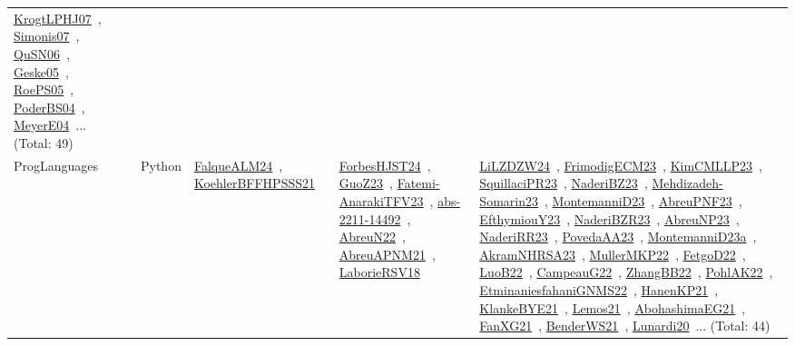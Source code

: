 {\begin{longtable}{lp{3cm}>{\raggedright\arraybackslash}p{6cm}>{\raggedright\arraybackslash}p{6cm}>{\raggedright\arraybackslash}p{8cm}}
\href{../works/KrogtLPHJ07.pdf}{KrogtLPHJ07}~\cite{KrogtLPHJ07}, \href{../works/Simonis07.pdf}{Simonis07}~\cite{Simonis07}, \href{../works/QuSN06.pdf}{QuSN06}~\cite{QuSN06}, \href{../works/Geske05.pdf}{Geske05}~\cite{Geske05}, \href{../works/RoePS05.pdf}{RoePS05}~\cite{RoePS05}, \href{../works/PoderBS04.pdf}{PoderBS04}~\cite{PoderBS04}, \href{../works/MeyerE04.pdf}{MeyerE04}~\cite{MeyerE04}... (Total: 49)\\
\index{Python}\index{ProgLanguages!Python}ProgLanguages & Python & \href{../works/FalqueALM24.pdf}{FalqueALM24}~\cite{FalqueALM24}, \href{../works/KoehlerBFFHPSSS21.pdf}{KoehlerBFFHPSSS21}~\cite{KoehlerBFFHPSSS21} & \href{../works/ForbesHJST24.pdf}{ForbesHJST24}~\cite{ForbesHJST24}, \href{../works/GuoZ23.pdf}{GuoZ23}~\cite{GuoZ23}, \href{../works/Fatemi-AnarakiTFV23.pdf}{Fatemi-AnarakiTFV23}~\cite{Fatemi-AnarakiTFV23}, \href{../works/abs-2211-14492.pdf}{abs-2211-14492}~\cite{abs-2211-14492}, \href{../works/AbreuN22.pdf}{AbreuN22}~\cite{AbreuN22}, \href{../works/AbreuAPNM21.pdf}{AbreuAPNM21}~\cite{AbreuAPNM21}, \href{../works/LaborieRSV18.pdf}{LaborieRSV18}~\cite{LaborieRSV18} & \href{../works/LiLZDZW24.pdf}{LiLZDZW24}~\cite{LiLZDZW24}, \href{../works/FrimodigECM23.pdf}{FrimodigECM23}~\cite{FrimodigECM23}, \href{../works/KimCMLLP23.pdf}{KimCMLLP23}~\cite{KimCMLLP23}, \href{../works/SquillaciPR23.pdf}{SquillaciPR23}~\cite{SquillaciPR23}, \href{../works/NaderiBZ23.pdf}{NaderiBZ23}~\cite{NaderiBZ23}, \href{../works/Mehdizadeh-Somarin23.pdf}{Mehdizadeh-Somarin23}~\cite{Mehdizadeh-Somarin23}, \href{../works/MontemanniD23.pdf}{MontemanniD23}~\cite{MontemanniD23}, \href{../works/AbreuPNF23.pdf}{AbreuPNF23}~\cite{AbreuPNF23}, \href{../works/EfthymiouY23.pdf}{EfthymiouY23}~\cite{EfthymiouY23}, \href{../works/NaderiBZR23.pdf}{NaderiBZR23}~\cite{NaderiBZR23}, \href{../works/AbreuNP23.pdf}{AbreuNP23}~\cite{AbreuNP23}, \href{../works/NaderiRR23.pdf}{NaderiRR23}~\cite{NaderiRR23}, \href{../works/PovedaAA23.pdf}{PovedaAA23}~\cite{PovedaAA23}, \href{../works/MontemanniD23a.pdf}{MontemanniD23a}~\cite{MontemanniD23a}, \href{../works/AkramNHRSA23.pdf}{AkramNHRSA23}~\cite{AkramNHRSA23}, \href{../works/MullerMKP22.pdf}{MullerMKP22}~\cite{MullerMKP22}, \href{../works/FetgoD22.pdf}{FetgoD22}~\cite{FetgoD22}, \href{../works/LuoB22.pdf}{LuoB22}~\cite{LuoB22}, \href{../works/CampeauG22.pdf}{CampeauG22}~\cite{CampeauG22}, \href{../works/ZhangBB22.pdf}{ZhangBB22}~\cite{ZhangBB22}, \href{../works/PohlAK22.pdf}{PohlAK22}~\cite{PohlAK22}, \href{../works/EtminaniesfahaniGNMS22.pdf}{EtminaniesfahaniGNMS22}~\cite{EtminaniesfahaniGNMS22}, \href{../works/HanenKP21.pdf}{HanenKP21}~\cite{HanenKP21}, \href{../works/KlankeBYE21.pdf}{KlankeBYE21}~\cite{KlankeBYE21}, \href{../works/Lemos21.pdf}{Lemos21}~\cite{Lemos21}, \href{../works/AbohashimaEG21.pdf}{AbohashimaEG21}~\cite{AbohashimaEG21}, \href{../works/FanXG21.pdf}{FanXG21}~\cite{FanXG21}, \href{../works/BenderWS21.pdf}{BenderWS21}~\cite{BenderWS21}, \href{../works/Lunardi20.pdf}{Lunardi20}~\cite{Lunardi20}... (Total: 44)\\
\end{longtable}
}

